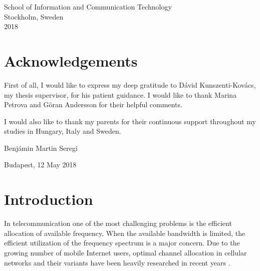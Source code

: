 \documentclass[a4paper, 12pt]{article}
\begin{document}
\begin{center}
\begin{figure}[!h]
\begin{center}
\end{center}
\end{figure}
{\large  School of Information and Communication Technology \\ \vspace{0.5cm}
Stockholm, Sweden\\2018}
\end{center}

\pagebreak
{}
\section*{Acknowledgements}
First of all, I would like to express my deep gratitude to Dávid Kunszenti-Kovács, my thesis supervisor, for his patient guidance. I would like to thank Marina Petrova and Göran Andersson for their helpful comments.

I would also like to thank my parents for their continuous support throughout my studies in Hungary, Italy and Sweden.

\begin{flushright}
Benjámin Martin Seregi

Budapest, 12 May 2018
\end{flushright}
\newpage
\tableofcontents
\newpage
{}
\newpage
\section{Introduction}
In telecommunication one of the most challenging problems is the efficient allocation of available frequency. When the available bandwidth is limited, the efficient utilization of the frequency spectrum is a major concern. Due to the growing number of mobile Internet users, optimal channel allocation in cellular networks and their variants have been heavily researched in recent years \cite{Audhya:2011:SCA:1988563.1988571}.
\end{document}
